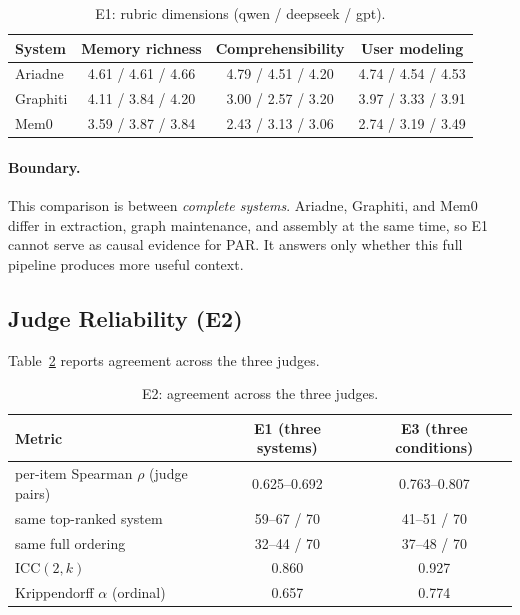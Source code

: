 \documentclass[11pt]{article}
\begin{document}
\begin{table}[t]
  \centering
  \small
  \begin{tabular}{@{}lccc@{}}
    \toprule
    System & Memory richness & Comprehensibility & User modeling \\
    \midrule
    Ariadne  & 4.61 / 4.61 / 4.66 & 4.79 / 4.51 / 4.20 & 4.74 / 4.54 / 4.53 \\
    Graphiti & 4.11 / 3.84 / 4.20 & 3.00 / 2.57 / 3.20 & 3.97 / 3.33 / 3.91 \\
    Mem0     & 3.59 / 3.87 / 3.84 & 2.43 / 3.13 / 3.06 & 2.74 / 3.19 / 3.49 \\
    \bottomrule
  \end{tabular}
  \caption{E1: rubric dimensions (qwen / deepseek / gpt).}\label{tab:e1dims}
\end{table}

\paragraph{Boundary.}
This comparison is between \emph{complete systems}. Ariadne, Graphiti, and Mem0 differ in
extraction, graph maintenance, and assembly at the same time, so E1 cannot serve as causal
evidence for PAR. It answers only whether this full pipeline produces more useful context.

\subsection{Judge Reliability (E2)}
\label{sec:e2}

Table~\ref{tab:e2} reports agreement across the three judges.
\begin{table}[t]
  \centering
  \small
  \begin{tabular}{@{}lcc@{}}
    \toprule
    Metric & E1 (three systems) & E3 (three conditions) \\
    \midrule
    per-item Spearman $\rho$ (judge pairs) & 0.625--0.692 & 0.763--0.807 \\
    same top-ranked system & 59--67 / 70 & 41--51 / 70 \\
    same full ordering & 32--44 / 70 & 37--48 / 70 \\
    $\mathrm{ICC}(2,k)$ & 0.860 & 0.927 \\
    Krippendorff $\alpha$ (ordinal) & 0.657 & 0.774 \\
    \bottomrule
  \end{tabular}
  \caption{E2: agreement across the three judges.}\label{tab:e2}
\end{table}
\end{document}
